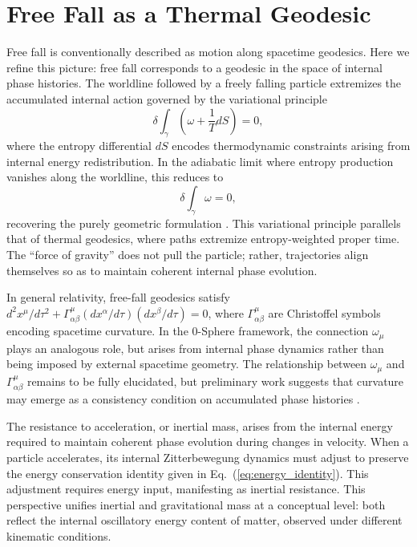 \documentclass[%
 reprint,
 amsmath,amssymb,
 aps,
 prb,
]{revtex4-2}
\numberwithin{equation}{section}
\begin{document}
\section{Free Fall as a Thermal Geodesic}
\label{sec:thermal_geodesic}

Free fall is conventionally described as motion along spacetime geodesics. Here we refine this picture: free fall corresponds to a geodesic in the space of internal phase histories. The worldline followed by a freely falling particle extremizes the accumulated internal action governed by the variational principle
\begin{equation}
\delta \int_{\gamma} \left(\omega + \frac{1}{T}dS\right) = 0,
\label{eq:thermal_geodesic_full}
\end{equation}
where the entropy differential $dS$ encodes thermodynamic constraints arising from internal energy redistribution. In the adiabatic limit where entropy production vanishes along the worldline, this reduces to
\begin{equation}
\delta \int_{\gamma} \omega = 0,
\label{eq:thermal_geodesic}
\end{equation}
recovering the purely geometric formulation \cite{Hanamura2025ThermalGeod}. This variational principle parallels that of thermal geodesics, where paths extremize entropy-weighted proper time. The ``force of gravity'' does not pull the particle; rather, trajectories align themselves so as to maintain coherent internal phase evolution.

In general relativity, free-fall geodesics satisfy $d^2 x^\mu/d\tau^2 + \Gamma^\mu_{\alpha\beta}(dx^\alpha/d\tau)(dx^\beta/d\tau) = 0$, where $\Gamma^\mu_{\alpha\beta}$ are Christoffel symbols encoding spacetime curvature. In the 0-Sphere framework, the connection $\omega_\mu$ plays an analogous role, but arises from internal phase dynamics rather than being imposed by external spacetime geometry. The relationship between $\omega_\mu$ and $\Gamma^\mu_{\alpha\beta}$ remains to be fully elucidated, but preliminary work suggests that curvature may emerge as a consistency condition on accumulated phase histories \cite{Hanamura2026Curvature}.

The resistance to acceleration, or inertial mass, arises from the internal energy required to maintain coherent phase evolution during changes in velocity. When a particle accelerates, its internal Zitterbewegung dynamics must adjust to preserve the energy conservation identity given in Eq.~(\ref{eq:energy_identity}). This adjustment requires energy input, manifesting as inertial resistance. This perspective unifies inertial and gravitational mass at a conceptual level: both reflect the internal oscillatory energy content of matter, observed under different kinematic conditions.
\end{document}
